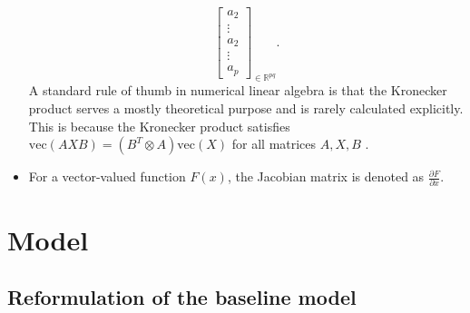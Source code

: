 \documentclass{article}
\begin{document}
\begin{itemize}
$${\begin{bmatrix}
            a_2 \\
            \vdots \\
            a_2 \\
            \vdots \\
            a_p
        \end{bmatrix}
        }_{\in \mathbb{R}^{pq}}
        .$$
        A standard rule of thumb in numerical linear algebra is that the Kronecker product serves a mostly theoretical purpose and is rarely calculated explicitly.
        This is because the Kronecker product satisfies $\mathrm{vec} \left(AXB\right) = \left(B^T \otimes A\right) \mathrm{vec}\left(X\right)$ for all matrices $A,X,B$ \cite[eq. 1.3.6]{Golub2013}.
    \item For a vector-valued function $F(x)$, the Jacobian matrix is denoted as $\frac{\partial F}{\partial x}$.
\end{itemize}

\section{Model}
\label{sec: model}

\subsection{Reformulation of the baseline model}
\end{document}
